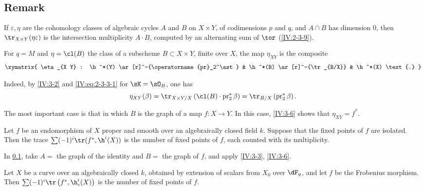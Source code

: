 \subsection{Remark}\label{IV:3-5}

If $\varepsilon,\eta$ are the cohomology classes of algebraic cycles $A$ and
$B$ on $X\times Y$, of codimensions $p$ and $q$, and $A\cap B$ has dimension
$0$, then $\tr_{X\times Y}(\eta\varepsilon)$ is the intersection
multiplicity $A\cdot B$, computed by an alternating sum of $\tor$
(\ref{IV:2-3-9}).






\begin{proposition_}\label{IV:3-6}
For $q=M$ and $\eta=\cl(B)$ the class of a subscheme
$B\subset X\times Y$, finite over $X$, the map $\eta_{X Y}$ is the composite
\[\xymatrix{
  \eta_{X Y} : \h^*(Y) \ar[r]^-{\operatorname{pr}_2^\ast}
    & \h^*(B) \ar[r]^-{\tr_{B/X}}
    & \h^*(X) \text{.}
}\]
\end{proposition_}

Indeed, by \ref{IV:3-2} and \eqref{IV:eq:2-3-3-1} for $\sK=\sO_B$, one has
\[
  \eta_{X Y}(\beta) = \tr_{X\times Y/X}\left(\cl(B)\cdot \operatorname{pr}_2^\ast\beta\right) = \tr_{B/X}\left(\operatorname{pr}_2^\ast \beta\right) \text{.}
\]

The most important case is that in which $B$ is the graph of a map
$f:X\to Y$. In this case, \ref{IV:3-6} shows that $\eta_{X Y}=f^\ast$.






\begin{corollary_}\label{IV:3-7}
Let $f$ be an endomorphism of $X$ proper and smooth over an algebraically
closed field $k$. Suppose that the fixed points of $f$ are isolated. Then the
trace $\sum (-1)^i \tr(f^\ast,\h^i(X))$ is the number of fixed points of $f$,
each counted with its multiplicity.
\end{corollary_}

In \ref{IV:3-5}, take $A=$ the graph of the identity and $B=$ the graph of
$f$, and apply \ref{IV:3-3}, \ref{IV:3-6}.






\begin{corollary_}\label{IV:3-8}
Let $X$ be a curve over an algebraically closed $k$, obtained by extension of
scalars from $X_0$ over $\dF_q$, and let $f$ be the Frobenius morphism. Then
$\sum (-1)^i \tr\left(f^\ast,\h_c^i(X)\right)$ is the number of fixed
points of $f$.
\end{corollary_}


